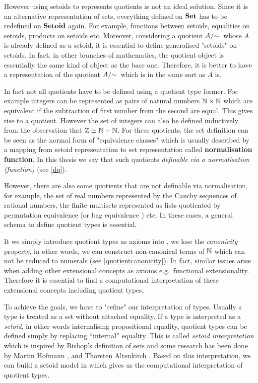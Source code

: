 However using setoids to represents quotients is not an ideal solution. Since it is an alternative representation of sets, everything defined on $\operatorname{\mathbf{Set}}$ has to be redefined on $\operatorname{\mathbf{Setoid}}$ again. 
For example, functions between setoids, equalities on setoids,
products on setoids etc. Moreover, considering a quotient $\qset{A}$ whose $A$ is already defined as a setoid, it is essential to define generalised "setoids" on setoids.
In fact, in other branches of mathematics, the quotient object is essentially the same kind of object as the base one.
Therefore, it is better to have a representation of the quotient $\qset{A}$ which is in the same sort as $A$ is. 

In fact not all quotients have to be defined using a quotient type former. For example integers can be represented as pairs of natural numbers $\mathbb{N} \times \mathbb{N}$ which are equivalent if the subtraction of first number from the second are equal. This gives rise to a quotient. However the set of integers can also be defined inductively from the observation that $\mathbb{Z} \simeq \mathbb{N} + \mathbb{N}$.
For these quotients, the set definition can be seen as the normal form of "equivalence classes" which is usually described by a mapping from setoid representation to set representation called \textbf{normalisation function}. In this thesis we say that such quotients \emph{definable via a normalisation (function)} (see \autoref{dq}).


However, there are also some quotients that are not definable via normalisation, for example, the set of real numbers represented by the Cauchy sequences of rational numbers, the finite multisets represented as lists quotiented by permutation equivalence (or bag equivalence \cite{DBLP:conf/itp/Danielsson12}) etc. In these cases, a general schema to define quotient types is essential.

It we simply introduce quotient types as axioms into \itt, we lose the \emph{canonicity} property, in other words, we can construct non-canonical terms of $\mathbb{N}$ which can not be reduced to numerals (see \autoref{quotientcanonicity}). In fact, similar issues arise when adding other extensional concepts as axioms e.g.\ functional extensionality. Therefore it is essential to find a computational interpretation of these extensional concepts including quotient types.

To achieve the goals, we have to "refine" our interpretation of types. Usually a type is treated as a set without attached equality. If a type is interpreted as a \emph{setoid}, in other words internalising propositional equality, quotient types can be defined simply by replacing ``internal'' equality. This is called \emph{setoid interpretation} which is inspired by Bishop's \cite{bishop} definition of sets and 
some research has been done by Martin Hofmann \cite{hof:phd,hof:95:sm}, and Thorsten Altenkirch \cite{alti:lics99,alti:ott-conf}. Based on this interpretation, we can build a setoid model in \itt which gives us the  computational interpretation of quotient types.

